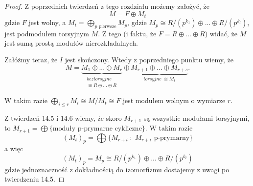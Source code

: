 \begin{proof}
  Z poprzednich twierdzeń z tego rozdziału możemy założyć, że
  $$M=F\oplus M_t$$
  gdzie $F$ jest wolny, a $M_t=\bigoplus_{p\text{ pierwsze}} M_p$, gdzie $M_p\cong R/(p^{k_1})\oplus ...\oplus R/(p^{k_l})$, jest podmodułem torsyjnym $M$. Z tego (i faktu, że $F=R\oplus...\oplus R$) widać, że $M$ jest sumą prostą modułów nierozkładalnych.

  Załóżmy teraz, że $I$ jest skończony. Wtedy z poprzedniego punktu wiemy, że
  $$M=\underbrace{M_1\oplus ...\oplus M_r}_{\substack{beztorsyjne\\\cong R\oplus...\oplus R}}\oplus \underbrace{M_{r+1}\oplus...\oplus M_{r+s}}_{torsyjne\;\cong M_t}.$$

  W takim razie $\bigoplus_{i\leq r}M_i\cong M/M_t\cong F$ jest modułem wolnym o wymiarze $r$.

  Z twierdzeń 14.5 i 14.6 wiemy, że skoro $M_{r+1}$ są wszystkie modułami torsyjnymi, to $M_{r+1}=\bigoplus\{\text{moduły p-prymarne cykliczne}\}$. W takim razie
  $$(M_t)_p=\bigoplus\{M_{r+i}\;:\;M_{r+i}\text{ p-prymarny}\}$$
  a więc 
  $$(M_t)_p=M_p\cong R/(p^{k_1})\oplus...\oplus R/(p^{k_l})$$
  gdzie jednoznaczność z dokładnością do izomorfizmu dostajemy z uwagi po twierdzeniu 14.5.
\end{proof}
